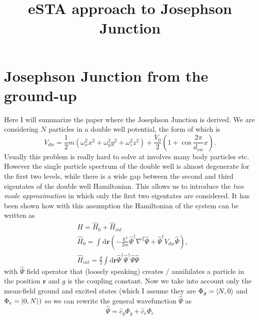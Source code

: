 \documentclass{article}
\title{eSTA approach to Josephson Junction}
\date{}
\author{}
\begin{document}

\maketitle

\section{Josephson Junction from the ground-up}
Here I will summarize the paper \cite{ABosonicJosepGati2007} where the Josephson Junction is derived.
We are considering  $ N $  particles in a double well potential, the form of which is
\begin{equation}
	\label{eq:HamiltonianDoubleWell}
	V_{dw} = \frac{1}{2} m \left(\omega^2_{x} x^2 + \omega^2_{y} y^2 + \omega^2_{z} z^2\right) + \frac{V_{0}}{2} \left(1 + \cos\frac{2\pi}{d_{sw}} x\right).
\end{equation}
Usually this problem is really hard to solve at involves many body particles etc. However the single particle spectrum of the double well is almost degenerate for the first two levels, while there is a wide gap between the second and third eigentates of the double well Hamiltonian.
This allows us to introduce the \textit{two mode approximation} in which only the first two eigentates are considered.
It has been shown how with this assumption the Hamiltonian of the system can be written as
\begin{align}
	\label{eq:HamiltonianDoubleWellIntegral}
	 & H = \hat{ H }_{0} + \hat{ H }_{int}                                                                                                                         \\
	 & \hat{H}_{0} = \int_{}^{}  \mathrm{d\mathbf{r}}\left(-\frac{\hbar^2}{2m} \hat{\Psi}^{\dag}\nabla^2\hat{ \Psi } + \hat{\Psi}^{\dag}V_{dw}\hat{ \Psi }\right)	, \\
	 & \hat{H}_{int} = \frac{g}{2}\int \mathrm{d\mathbf{r}} \hat{\Psi}^{\dag}\hat{\Psi}^{\dag}\hat{ \Psi }\hat{ \Psi }
\end{align}
with $ \hat{\Psi} $ field operator that (loosely speaking) creates / annihilates a particle in the position $ \mathbf{r} $ and $ g $ is the coupling constant.
Now we take into account only the mean-field ground and excited states (which I assume they are $\Phi_g = \ket{N,0}$ and  $\Phi_e = \ket{0,N})$ so we can rewrite the general wavefunction $\hat{ \Psi }$ as
\begin{equation}
	\label{eq:GeneralState}
	\hat{\Psi} = \hat{c}_{g}\Phi_g + \hat{c}_{e}\Phi_e
\end{equation}
\end{document}
